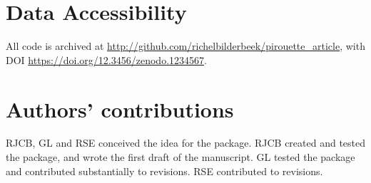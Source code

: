 \documentclass{article}
\begin{document}
\section{Data Accessibility}

All code is archived at \url{http://github.com/richelbilderbeek/pirouette_article},
with DOI \url{https://doi.org/12.3456/zenodo.1234567}.

\section{Authors' contributions}

RJCB, GL and RSE conceived the idea for the package. 
RJCB created and tested the package, and wrote the first draft of the manuscript.
GL tested the package and contributed substantially to revisions.
RSE contributed to revisions.



\end{document}

